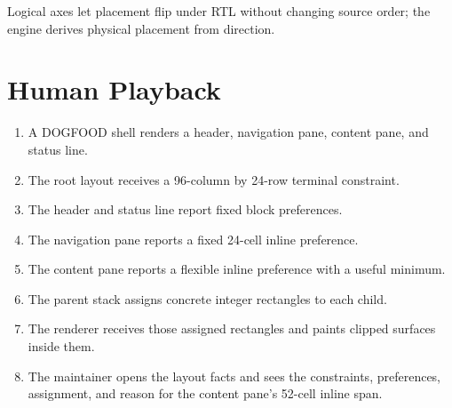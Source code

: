 \begin{center}
\end{center}

Logical axes let placement flip under RTL without changing source order; the engine derives physical placement from direction.

\section{Human Playback}\label{record-163-human-playback}

\begin{enumerate}
\def\labelenumi{\arabic{enumi}.}
\tightlist
\item
  A DOGFOOD shell renders a header, navigation pane, content pane, and status line.
\item
  The root layout receives a 96-column by 24-row terminal constraint.
\item
  The header and status line report fixed block preferences.
\item
  The navigation pane reports a fixed 24-cell inline preference.
\item
  The content pane reports a flexible inline preference with a useful minimum.
\item
  The parent stack assigns concrete integer rectangles to each child.
\item
  The renderer receives those assigned rectangles and paints clipped surfaces inside them.
\item
  The maintainer opens the layout facts and sees the constraints, preferences, assignment, and reason for the content pane's 52-cell inline span.
\end{enumerate}

